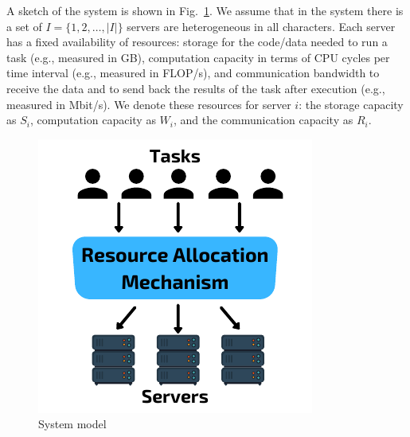 A sketch of the system is shown in Fig.~\ref{fig:system_model}.
We assume that in the system there is a set of $I = \{1,2,\ldots,\left|I\right|\}$ servers are heterogeneous in all
characters. Each server has a fixed availability of resources: storage for the code/data needed to run a task
(e.g., measured in GB), computation capacity in terms of CPU cycles per time interval (e.g., measured in FLOP/s),
and communication bandwidth to receive the data and to send back the results of the task after execution (e.g., measured in Mbit/s).
We denote these resources for server $i$: the storage capacity as $S_i$, computation capacity as $W_i$,
and the communication capacity as $R_i$.

\begin{figure}
    \centering
    \includegraphics{figures/system_model.pdf}
    \caption{System model}
    \label{fig:system_model}
\end{figure}

